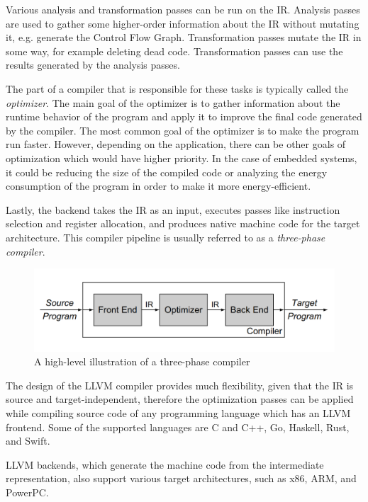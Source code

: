 \documentclass[
  digital, %
  notable,   %
  twoside, %
  nolof,     %
  nolot,     %
]{fithesis3}
\theoremstyle{definition}
\begin{document}
Various analysis and transformation passes can be run on the IR. Analysis passes are used to gather some higher-order information about the IR without mutating it, e.g. generate the Control Flow Graph. Transformation passes mutate the IR in some way, for example deleting dead code. Transformation passes can use the results generated by the analysis passes. 

The part of a compiler that is responsible for these tasks is typically called the \textit{optimizer}. The main goal of the optimizer is to gather information about the runtime behavior of the program and apply it to improve the final code generated by the compiler. The most common goal of the optimizer is to make the program run faster. However, depending on the application, there can be other goals of optimization which would have higher priority. In the case of embedded systems, it could be reducing the size of the compiled code or analyzing the energy consumption of the program in order to make it more energy-efficient\cite{energy_consuption}. 

Lastly, the backend takes the IR as an input, executes passes like instruction selection and register allocation, and produces native machine code for the target architecture. This compiler pipeline is usually referred to as a \textit{three-phase compiler}.

\begin{figure}
    \centering
    \includegraphics[width=\textwidth]{3phase.png}
    \caption{A high-level illustration of a three-phase compiler \cite{eng_comp}}
    \label{fig:3phase}
\end{figure}
    
The design of the LLVM compiler provides much flexibility, given that the IR is source and target-independent, therefore the optimization passes can be applied while compiling source code of any programming language which has an LLVM frontend. Some of the supported languages are C and C++, Go, Haskell, Rust, and Swift. 

LLVM backends, which generate the machine code from the intermediate representation, also support various target architectures, such as x86, ARM, and PowerPC.
\end{document}
